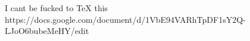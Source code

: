 I cant be fucked to TeX this https://docs.google.com/document/d/1VbE94VARhTpDF1sY2Q-LJoO6bubeMeHY/edit